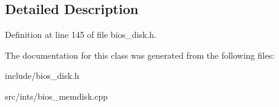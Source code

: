\subsection{Detailed Description}


Definition at line 145 of file bios\-\_\-disk.\-h.



The documentation for this class was generated from the following files\-:\begin{DoxyCompactItemize}
\item 
include/bios\-\_\-disk.\-h\item 
src/ints/bios\-\_\-memdisk.\-cpp\end{DoxyCompactItemize}
